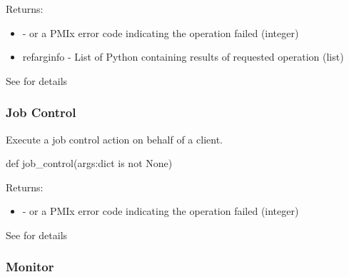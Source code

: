 Returns:
\begin{itemize}
    \item {} -  or a \ac{PMIx} error code indicating the operation failed (integer)
    \item refarg{info} - List of Python  containing results of requested operation (list)
\end{itemize}

See  for details


\subsubsection{Job Control}

\summary

Execute a job control action on behalf of a client.

\format

\pyspecificstart
\begin{codepar}
def job_control(args:dict is not None)
\end{codepar}
\pyspecificend

\begin{arglist}
\end{arglist}

Returns:
\begin{itemize}
    \item {} -  or a \ac{PMIx} error code indicating the operation failed (integer)
\end{itemize}

See  for details


\subsubsection{Monitor}

\summary


